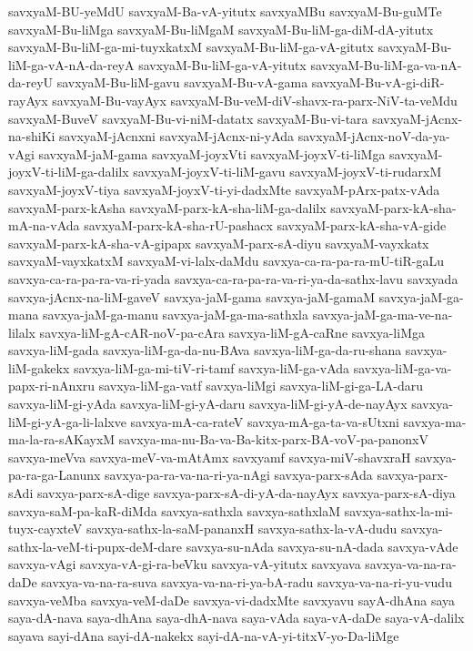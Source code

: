 {savxyaM-BU-yeMdU
savxyaM-Ba-vA-yitutx
savxyaMBu
savxyaM-Bu-guMTe
savxyaM-Bu-liMga
savxyaM-Bu-liMgaM
savxyaM-Bu-liM-ga-diM-dA-yitutx
savxyaM-Bu-liM-ga-mi-tuyxkatxM
savxyaM-Bu-liM-ga-vA-gitutx
savxyaM-Bu-liM-ga-vA-nA-da-reyA
savxyaM-Bu-liM-ga-vA-yitutx
savxyaM-Bu-liM-ga-va-nA-da-reyU
savxyaM-Bu-liM-gavu
savxyaM-Bu-vA-gama
savxyaM-Bu-vA-gi-diR-rayAyx
savxyaM-Bu-vayAyx
savxyaM-Bu-veM-diV-shavx-ra-parx-NiV-ta-veMdu
savxyaM-BuveV
savxyaM-Bu-vi-niM-datatx
savxyaM-Bu-vi-tara
savxyaM-jAcnx-na-shiKi
savxyaM-jAcnxni
savxyaM-jAcnx-ni-yAda
savxyaM-jAcnx-noV-da-ya-vAgi
savxyaM-jaM-gama
savxyaM-joyxVti
savxyaM-joyxV-ti-liMga
savxyaM-joyxV-ti-liM-ga-dalilx
savxyaM-joyxV-ti-liM-gavu
savxyaM-joyxV-ti-rudarxM
savxyaM-joyxV-tiya
savxyaM-joyxV-ti-yi-dadxMte
savxyaM-pArx-patx-vAda
savxyaM-parx-kAsha
savxyaM-parx-kA-sha-liM-ga-dalilx
savxyaM-parx-kA-sha-mA-na-vAda
savxyaM-parx-kA-sha-rU-pashacx
savxyaM-parx-kA-sha-vA-gide
savxyaM-parx-kA-sha-vA-gipapx
savxyaM-parx-sA-diyu
savxyaM-vayxkatx
savxyaM-vayxkatxM
savxyaM-vi-lalx-daMdu
savxya-ca-ra-pa-ra-mU-tiR-gaLu
savxya-ca-ra-pa-ra-va-ri-yada
savxya-ca-ra-pa-ra-va-ri-ya-da-sathx-lavu
savxyada
savxya-jAcnx-na-liM-gaveV
savxya-jaM-gama
savxya-jaM-gamaM
savxya-jaM-ga-mana
savxya-jaM-ga-manu
savxya-jaM-ga-ma-sathxla
savxya-jaM-ga-ma-ve-na-lilalx
savxya-liM-gA-cAR-noV-pa-cAra
savxya-liM-gA-caRne
savxya-liMga
savxya-liM-gada
savxya-liM-ga-da-nu-BAva
savxya-liM-ga-da-ru-shana
savxya-liM-gakekx
savxya-liM-ga-mi-tiV-ri-tamf
savxya-liM-ga-vAda
savxya-liM-ga-va-papx-ri-nAnxru
savxya-liM-ga-vatf
savxya-liMgi
savxya-liM-gi-ga-LA-daru
savxya-liM-gi-yAda
savxya-liM-gi-yA-daru
savxya-liM-gi-yA-de-nayAyx
savxya-liM-gi-yA-ga-li-lalxve
savxya-mA-ca-rateV
savxya-mA-ga-ta-va-sUtxni
savxya-ma-ma-la-ra-sAKayxM
savxya-ma-nu-Ba-va-Ba-kitx-parx-BA-voV-pa-panonxV
savxya-meVva
savxya-meV-va-mAtAmx
savxyamf
savxya-miV-shavxraH
savxya-pa-ra-ga-Lanunx
savxya-pa-ra-va-na-ri-ya-nAgi
savxya-parx-sAda
savxya-parx-sAdi
savxya-parx-sA-dige
savxya-parx-sA-di-yA-da-nayAyx
savxya-parx-sA-diya
savxya-saM-pa-kaR-diMda
savxya-sathxla
savxya-sathxlaM
savxya-sathx-la-mi-tuyx-cayxteV
savxya-sathx-la-saM-pananxH
savxya-sathx-la-vA-dudu
savxya-sathx-la-veM-ti-pupx-deM-dare
savxya-su-nAda
savxya-su-nA-dada
savxya-vAde
savxya-vAgi
savxya-vA-gi-ra-beVku
savxya-vA-yitutx
savxyava
savxya-va-na-ra-daDe
savxya-va-na-ra-suva
savxya-va-na-ri-ya-bA-radu
savxya-va-na-ri-yu-vudu
savxya-veMba
savxya-veM-daDe
savxya-vi-dadxMte
savxyavu
sayA-dhAna
saya
saya-dA-nava
saya-dhAna
saya-dhA-nava
saya-vAda
saya-vA-daDe
saya-vA-dalilx
sayava
sayi-dAna
sayi-dA-nakekx
sayi-dA-na-vA-yi-titxV-yo-Da-liMge
}
